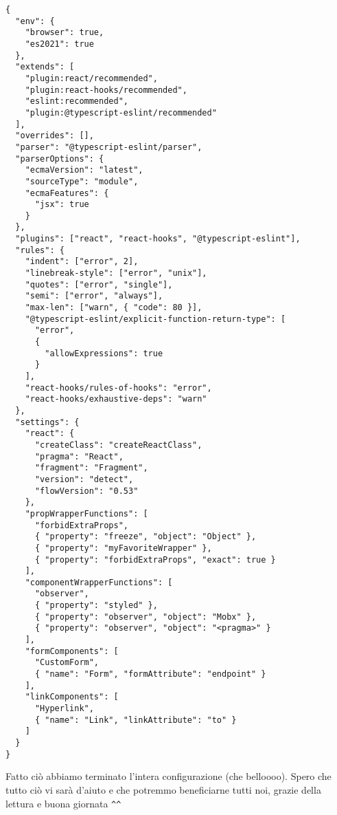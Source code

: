 \begin{verbatim}
{
  "env": {
    "browser": true,
    "es2021": true
  },
  "extends": [
    "plugin:react/recommended",
    "plugin:react-hooks/recommended",
    "eslint:recommended",
    "plugin:@typescript-eslint/recommended"
  ],
  "overrides": [],
  "parser": "@typescript-eslint/parser",
  "parserOptions": {
    "ecmaVersion": "latest",
    "sourceType": "module",
    "ecmaFeatures": {
      "jsx": true
    }
  },
  "plugins": ["react", "react-hooks", "@typescript-eslint"],
  "rules": {
    "indent": ["error", 2],
    "linebreak-style": ["error", "unix"],
    "quotes": ["error", "single"],
    "semi": ["error", "always"],
    "max-len": ["warn", { "code": 80 }],
    "@typescript-eslint/explicit-function-return-type": [
      "error",
      {
        "allowExpressions": true
      }
    ],
    "react-hooks/rules-of-hooks": "error",
    "react-hooks/exhaustive-deps": "warn"
  },
  "settings": {
    "react": {
      "createClass": "createReactClass",
      "pragma": "React",
      "fragment": "Fragment",
      "version": "detect",
      "flowVersion": "0.53"
    },
    "propWrapperFunctions": [
      "forbidExtraProps",
      { "property": "freeze", "object": "Object" },
      { "property": "myFavoriteWrapper" },
      { "property": "forbidExtraProps", "exact": true }
    ],
    "componentWrapperFunctions": [
      "observer",
      { "property": "styled" },
      { "property": "observer", "object": "Mobx" },
      { "property": "observer", "object": "<pragma>" }
    ],
    "formComponents": [
      "CustomForm",
      { "name": "Form", "formAttribute": "endpoint" }
    ],
    "linkComponents": [
      "Hyperlink",
      { "name": "Link", "linkAttribute": "to" }
    ]
  }
}
\end{verbatim}

Fatto ciò abbiamo terminato l'intera configurazione (che belloooo). Spero che tutto ciò vi sarà d'aiuto e che potremmo beneficiarne tutti noi, grazie della lettura e buona giornata \verb|^^|
